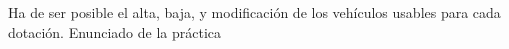 {\reportauthors}
{Ha de ser posible el alta, baja, y modificación de los vehículos usables para cada dotación.}
{}
{Enunciado de la práctica}


